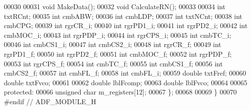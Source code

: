 \begin{DoxyCode}
00030 
00031     \textcolor{keywordtype}{void} MakeData();
00032     \textcolor{keywordtype}{void} CalculateRN();
00033 
00034     \textcolor{keywordtype}{int} txtRCnt;
00035     \textcolor{keywordtype}{int} cmbABW;
00036     \textcolor{keywordtype}{int} cmbLDP;
00037     \textcolor{keywordtype}{int} txtNCnt;
00038     \textcolor{keywordtype}{int} cmbCPG;
00039     \textcolor{keywordtype}{int} rgrCR_i;
00040     \textcolor{keywordtype}{int} rgrPD1_i;
00041     \textcolor{keywordtype}{int} rgrPD2_i;
00042     \textcolor{keywordtype}{int} cmbMOC_i;
00043     \textcolor{keywordtype}{int} rgrPDP_i;
00044     \textcolor{keywordtype}{int} rgrCPS_i;
00045     \textcolor{keywordtype}{int} cmbTC_i;
00046     \textcolor{keywordtype}{int} cmbCS1_i;
00047     \textcolor{keywordtype}{int} cmbCS2_i;
00048     \textcolor{keywordtype}{int} rgrCR_f;
00049     \textcolor{keywordtype}{int} rgrPD1_f;
00050     \textcolor{keywordtype}{int} rgrPD2_f;
00051     \textcolor{keywordtype}{int} cmbMOC_f;
00052     \textcolor{keywordtype}{int} rgrPDP_f;
00053     \textcolor{keywordtype}{int} rgrCPS_f;
00054     \textcolor{keywordtype}{int} cmbTC_f;
00055     \textcolor{keywordtype}{int} cmbCS1_f;
00056     \textcolor{keywordtype}{int} cmbCS2_f;
00057     \textcolor{keywordtype}{int} cmbFL_f;
00058     \textcolor{keywordtype}{int} cmbFL_i;
00059     \textcolor{keywordtype}{double} txtFref;
00060     \textcolor{keywordtype}{double} txtFvco;
00061 
00062     \textcolor{keywordtype}{double} lblFcomp;
00063     \textcolor{keywordtype}{double} lblFvco;
00064 
00065 \textcolor{keyword}{protected}:
00066     \textcolor{keywordtype}{unsigned} \textcolor{keywordtype}{char} m\_registers[12];
00067 \};
00068 
00069 \}
00070 \textcolor{preprocessor}{#endif // ADF\_MODULE\_H}
\end{DoxyCode}
